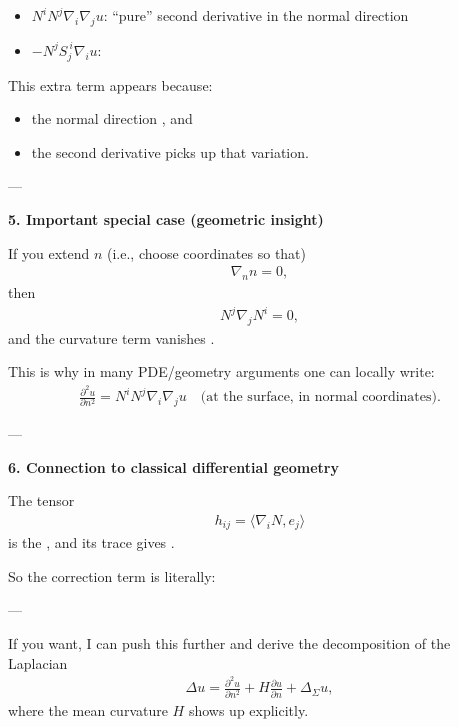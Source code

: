 \documentclass[12pt,a4paper]{report}
\begin{document}
\begin{description}
\begin{itemize}
\item $N^i N^j \nabla_i \nabla_j u$: “pure” second derivative in the normal direction
\item $- N^j S_j^{\ i} \nabla_i u$: 
\end{itemize}

This extra term appears because:

\begin{itemize}
\item  the normal direction , and
\item  the second derivative picks up that variation.
\end{itemize}

---

\item \textbf{ 5. Important special case (geometric insight)}

If you extend $n$  (i.e., choose coordinates so that)
\begin{align*}
\nabla_n n = 0,
\end{align*}
then
\begin{align*}
N^j \nabla_j N^i = 0,
\end{align*}
and the curvature term vanishes .

This is why in many PDE/geometry arguments one can locally write:
\begin{align*}
\frac{\partial^2 u}{\partial n^2}
= N^i N^j \nabla_i \nabla_j u
\quad \text{(at the surface, in normal coordinates)}.
\end{align*}

---

\item \textbf{ 6. Connection to classical differential geometry}

The tensor
\begin{align*}
h_{ij} = \langle \nabla_i N, e_j \rangle
\end{align*}
is the , and its trace gives .

So the correction term is literally:


---
\end{description}

If you want, I can push this further and derive the decomposition of the Laplacian
\begin{align*}
\Delta u = \frac{\partial^2 u}{\partial n^2} + H \frac{\partial u}{\partial n} + \Delta_\Sigma u,
\end{align*}
where the mean curvature $H$ shows up explicitly.
\end{document}
